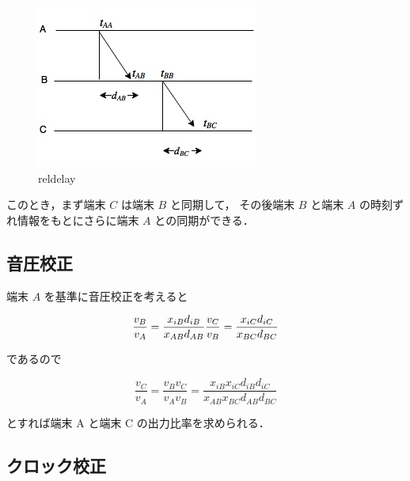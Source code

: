 \begin{figure}[tb]\centering
  \hspace{-2mm}\includegraphics[clip,width=1.1\hsize]{img/rel_delay.png}
  \caption{reldelay}\label{fig:reldelay}
\end{figure}

このとき，まず端末 $C$ は端末 $B$ と同期して，
その後端末 $B$ と端末 $A$ の時刻ずれ情報をもとにさらに端末 $A$ との同期ができる．


\subsection{音圧校正}

端末 $A$ を基準に音圧校正を考えると

$$
\frac{v_B}{v_A} = \frac{x_{iB} d_{iB}}{x_{AB}d_{AB}} \\
\frac{v_C}{v_B} = \frac{x_{iC} d_{iC}}{x_{BC}d_{BC}} \\
$$

であるので

$$
\frac{v_C}{v_A} =
\frac{v_B v_C}{v_A v_B} =
\frac{x_{iB} x_{iC} d_{iB} d_{iC}}{x_{AB} x_{BC} d_{AB} d_{BC}}
$$

とすれば端末 A と端末 C の出力比率を求められる．

\subsection{クロック校正}

